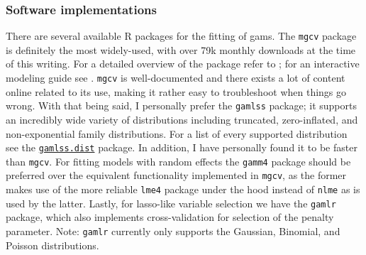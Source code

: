 \documentclass{report}
\begin{document}
\subsubsection{Software implementations}

There are several available R packages for the fitting of \glspl{gam}. The \texttt{mgcv} package is definitely the most widely-used, with over 79k monthly downloads at the time of this writing. For a detailed overview of the package refer to \cite[Chapter~7]{wood_generalized_2017}; for an interactive modeling guide see \cite{ross_generalized_2019}. \texttt{mgcv} is well-documented and there exists a lot of content online related to its use, making it rather easy to troubleshoot when things go wrong. With that being said, I personally prefer the \texttt{gamlss} package; it supports an incredibly wide variety of distributions including truncated, zero-inflated, and non-exponential family distributions. For a list of every supported distribution see the \href{https://cran.r-project.org/web/packages/gamlss.dist/gamlss.dist.pdf}{\texttt{gamlss.dist}} package. In addition, I have personally found it to be faster than \texttt{mgcv}. For fitting models with random effects the \texttt{gamm4} package should be preferred over the equivalent functionality implemented in \texttt{mgcv}, as the former makes use of the more reliable \texttt{lme4} package under the hood instead of \texttt{nlme} as is used by the latter. Lastly, for \gls{lasso}-like variable selection we have the \texttt{gamlr} package, which also implements cross-validation for selection of the penalty parameter. Note: \texttt{gamlr} currently only supports the Gaussian, Binomial, and Poisson distributions. 
\end{document}
